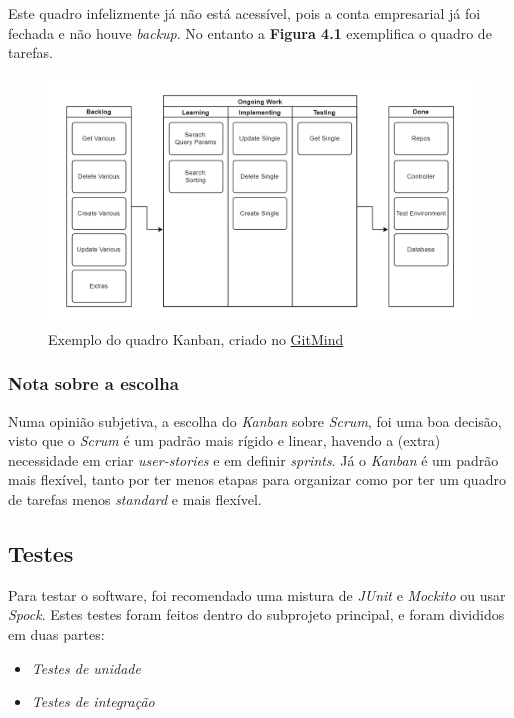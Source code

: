 Este quadro infelizmente já não está acessível, pois a conta empresarial já foi fechada e não houve \textit{backup}. No entanto a \textbf{Figura 4.1} exemplifica o quadro de tarefas.

\begin{figure}[!hbt]
  \centering
  \includegraphics[width=14cm]{figuras/kanban.png}
  \caption{Exemplo do quadro Kanban, criado no \href{https://gitmind.com/app/flowchart/e7311869657}{GitMind}}
  \label{fig:kanban}
\end{figure}
\FloatBarrier

\subsubsection{Nota sobre a escolha}

Numa opinião subjetiva, a escolha do \textit{Kanban} sobre \textit{Scrum}, foi uma boa decisão, visto que o \textit{Scrum} é um padrão mais rígido e linear, havendo a (extra) necessidade em criar \textit{user-stories} e em definir \textit{sprints}. Já o \textit{Kanban} é um padrão mais flexível, tanto por ter menos etapas para organizar como por ter um quadro de tarefas menos \textit{standard} e mais flexível.

\subsection{Testes}

Para testar o software, foi recomendado uma mistura de \textit{JUnit} e \textit{Mockito} ou usar \textit{Spock}. Estes testes foram feitos dentro do subprojeto principal, e foram divididos em duas partes:

\begin{itemize}
  \item \textit{Testes de unidade}
  \item \textit{Testes de integração}
\end{itemize}

